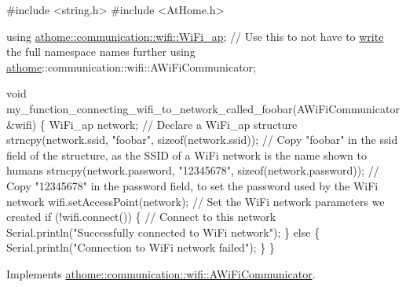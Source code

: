 \begin{DoxyCode}
\textcolor{preprocessor}{#include <string.h>}
\textcolor{preprocessor}{#include <AtHome.h>}

\textcolor{keyword}{using} \mbox{\hyperlink{structathome_1_1communication_1_1wifi_1_1s__wifi__access__point}{athome::communication::wifi::WiFi\_ap}}; \textcolor{comment}{// Use this to not have to}
\mbox{\hyperlink{classathome_1_1communication_1_1wifi_1_1_native_arduino_e_s_p_wi_fi_communicator_a99fab41ad5275649efafa0a776a0348f}{write}} the full \textcolor{keyword}{namespace }names further using
\mbox{\hyperlink{namespaceathome}{athome}}::communication::wifi::AWiFiCommunicator;

void my\_function\_connecting\_wifi\_to\_network\_called\_foobar(AWiFiCommunicator
&wifi) \{ WiFi\_ap network; \textcolor{comment}{// Declare a WiFi\_ap structure}
  strncpy(network.ssid, \textcolor{stringliteral}{"foobar"}, \textcolor{keyword}{sizeof}(network.ssid)); \textcolor{comment}{// Copy "foobar"}
in the ssid field of the structure, as the SSID of a WiFi network is the
name shown to humans strncpy(network.password, \textcolor{stringliteral}{"12345678"},
\textcolor{keyword}{sizeof}(network.password)); \textcolor{comment}{// Copy "12345678" in the password field, to set}
the password used by the WiFi network wifi.setAccessPoint(network); \textcolor{comment}{// Set}
the WiFi network parameters we created \textcolor{keywordflow}{if} (!wifi.connect()) \{ \textcolor{comment}{// Connect to}
\textcolor{keyword}{this} network Serial.println(\textcolor{stringliteral}{"Successfully connected to WiFi network"}); \}
\textcolor{keywordflow}{else} \{ Serial.println(\textcolor{stringliteral}{"Connection to WiFi network failed"});
  \}
\}
\end{DoxyCode}
 

Implements \mbox{\hyperlink{classathome_1_1communication_1_1wifi_1_1_a_wi_fi_communicator_a309927109fbc19aa0fb2afb71d50bbf9}{athome\+::communication\+::wifi\+::\+A\+Wi\+Fi\+Communicator}}.

\mbox{\label{classathome_1_1communication_1_1wifi_1_1_native_arduino_e_s_p_wi_fi_communicator_ab3f6a0e1b9d3be98a876f95dde97976b}} 
